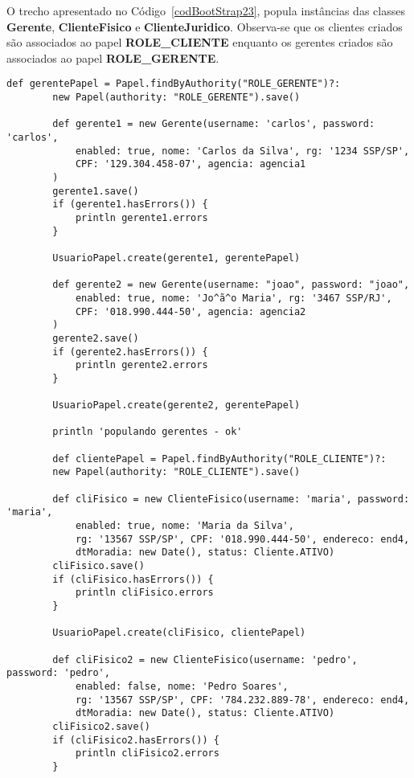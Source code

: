 \newpage

O  trecho  apresentado  no  Código~\ref{codBootStrap23}, popula  instâncias  das
classes {\bf  Gerente}, {\bf ClienteFisico} e  {\bf ClienteJuridico}. Observa-se
que os clientes criados são  associados ao papel {\bf ROLE\_CLIENTE} enquanto os
gerentes criados são associados ao papel {\bf ROLE\_GERENTE}. 

\begin{lstlisting}[caption={\bf BootStrap.groovy (3)}, frame = trBL, float=htbp,
    label=codBootStrap23]
        def gerentePapel = Papel.findByAuthority("ROLE_GERENTE")?:
        new Papel(authority: "ROLE_GERENTE").save()
        
        def gerente1 = new Gerente(username: 'carlos', password: 'carlos',
            enabled: true, nome: 'Carlos da Silva', rg: '1234 SSP/SP',
            CPF: '129.304.458-07', agencia: agencia1
        )
        gerente1.save()
        if (gerente1.hasErrors()) {
            println gerente1.errors
        }
        
        UsuarioPapel.create(gerente1, gerentePapel)
        
        def gerente2 = new Gerente(username: "joao", password: "joao",
            enabled: true, nome: 'Jo^ã^o Maria', rg: '3467 SSP/RJ',            
            CPF: '018.990.444-50', agencia: agencia2
        )
        gerente2.save()
        if (gerente2.hasErrors()) {
            println gerente2.errors
        }
       
        UsuarioPapel.create(gerente2, gerentePapel)
        
        println 'populando gerentes - ok'

        def clientePapel = Papel.findByAuthority("ROLE_CLIENTE")?:
        new Papel(authority: "ROLE_CLIENTE").save()
        
        def cliFisico = new ClienteFisico(username: 'maria', password: 'maria',
            enabled: true, nome: 'Maria da Silva', 
            rg: '13567 SSP/SP', CPF: '018.990.444-50', endereco: end4,
            dtMoradia: new Date(), status: Cliente.ATIVO) 
        cliFisico.save()
        if (cliFisico.hasErrors()) {
            println cliFisico.errors
        }
        
        UsuarioPapel.create(cliFisico, clientePapel)
        
        def cliFisico2 = new ClienteFisico(username: 'pedro', password: 'pedro',
            enabled: false, nome: 'Pedro Soares', 
            rg: '13567 SSP/SP', CPF: '784.232.889-78', endereco: end4,
            dtMoradia: new Date(), status: Cliente.ATIVO) 
        cliFisico2.save()
        if (cliFisico2.hasErrors()) {
            println cliFisico2.errors
        }
        

\end{lstlisting}
